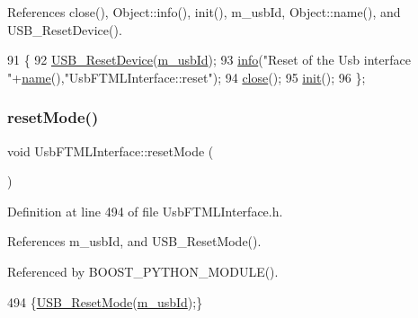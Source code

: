 References close(), Object\+::info(), init(), m\+\_\+usb\+Id, Object\+::name(), and U\+S\+B\+\_\+\+Reset\+Device().


\begin{DoxyCode}
91                        \{
92     \hyperlink{LALUsbML_8h_a77b48cfbf9075545430b778cd4ad777f}{USB\_ResetDevice}(\hyperlink{classUsbFTMLInterface_aab6754587c303660d5c498ce34a2b4c8}{m\_usbId});
93     \hyperlink{classObject_a644fd329ea4cb85f54fa6846484b84a8}{info}(\textcolor{stringliteral}{"Reset of the Usb interface "}+\hyperlink{classObject_a300f4c05dd468c7bb8b3c968868443c1}{name}(),\textcolor{stringliteral}{"UsbFTMLInterface::reset"});
94     \hyperlink{classUsbFTMLInterface_a1eaa27bd62bc381f60aa837f70a70117}{close}();
95     \hyperlink{classUsbFTMLInterface_a7f7c96ece97e607b88425823a2923a43}{init}();
96   \};
\end{DoxyCode}
\mbox{\label{classUsbFTMLInterface_a91063d4374b617177c6b7a4022385dd1}} 
\subsubsection{\texorpdfstring{reset\+Mode()}{resetMode()}}
{\footnotesize\ttfamily void Usb\+F\+T\+M\+L\+Interface\+::reset\+Mode (\begin{DoxyParamCaption}{ }\end{DoxyParamCaption})\hspace{0.3cm}{\ttfamily [inline]}}



Definition at line 494 of file Usb\+F\+T\+M\+L\+Interface.\+h.



References m\+\_\+usb\+Id, and U\+S\+B\+\_\+\+Reset\+Mode().



Referenced by B\+O\+O\+S\+T\+\_\+\+P\+Y\+T\+H\+O\+N\+\_\+\+M\+O\+D\+U\+L\+E().


\begin{DoxyCode}
494 \{\hyperlink{LALUsbML_8h_a784f57af1433a5334f4a7d23ee4caad9}{USB\_ResetMode}(\hyperlink{classUsbFTMLInterface_aab6754587c303660d5c498ce34a2b4c8}{m\_usbId});\}
\end{DoxyCode}
\mbox{\label{classUsbFTMLInterface_a41db8f21098bca8fb7a85ce1058ab10b}} 
